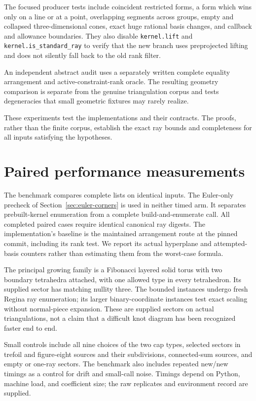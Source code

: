 \documentclass[11pt,letterpaper]{article}
\theoremstyle{definition}
\theoremstyle{remark}\newtheorem{remark}[theorem]{Remark}
\newcommand{\code}[1]{\nolinkurl{#1}}
\begin{document}
The focused producer tests include coincident restricted forms, a form
which wins only on a line or at a point, overlapping segments across
groups, empty and collapsed three-dimensional cones, exact huge rational
basis changes, and callback and allowance boundaries. They also disable
\code{kernel.lift} and \code{kernel.is_standard_ray} to verify that the
new branch uses preprojected lifting and does not silently fall back to
the old rank filter.

An independent abstract audit uses a separately written complete equality
arrangement and active-constraint-rank oracle. The resulting geometry
comparison is separate from the genuine triangulation corpus and tests
degeneracies that small geometric fixtures may rarely realize.



These experiments test the implementations and their contracts. The
proofs, rather than the finite corpus, establish the exact ray bounds
and completeness for all inputs satisfying the hypotheses.

\section{Paired performance measurements}
\label{sec:benchmarks}

The benchmark compares complete lists on identical inputs. The Euler-only
precheck of Section~\ref{sec:euler-corners} is used in neither timed arm.
It separates
prebuilt-kernel enumeration from a complete build-and-enumerate call.
All completed paired cases require identical canonical ray digests.
The implementation's baseline is the maintained arrangement route at
the pinned commit, including its rank test. We report its actual
hyperplane and attempted-basis counters rather than estimating them from
the worst-case formula.

The principal growing family is a Fibonacci layered solid torus with two
boundary tetrahedra attached, with one allowed type in every tetrahedron.
Its supplied sector has matching nullity three. The bounded instances
undergo fresh Regina ray enumeration; its larger binary-coordinate
instances test exact scaling without normal-piece expansion. These are
supplied sectors on actual triangulations, not a claim that a difficult
knot diagram has been recognized faster end to end.

Small controls include all nine choices of the two cap types, selected
sectors in trefoil and figure-eight sources and their subdivisions,
connected-sum sources, and empty or one-ray sectors. The benchmark also
includes repeated new/new timings as a control for drift and small-call
noise. Timings depend on Python, machine load, and coefficient size;
the raw replicates and environment record are supplied.
\end{document}
